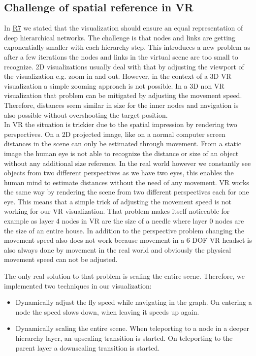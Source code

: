 \subsection{Challenge of spatial reference in VR}
\label{chap:ps-spatialReference}
In \hyperref[req:R7]{R7} we stated that the visualization should ensure an equal representation of deep hierarchical networks. The challenge is that nodes and links are getting exponentially smaller with each hierarchy step.
This introduces a new problem as after a few iterations the nodes and links in the virtual scene are too small to recognize.
2D visualizations usually deal with that by adjusting the viewport of the visualization e.g. zoom in and out. 
However, in the context of a 3D VR visualization a simple zooming approach is not possible. 
In a 3D non VR visualization that problem can be mitigated by adjusting the movement speed. Therefore, distances seem similar in size for the inner nodes and navigation is also possible without overshooting the target position.\\ 
In VR the situation is trickier due to the spatial impression by rendering two perspectives. On a 2D projected image, like on a normal computer screen distances in the scene can only be estimated through movement. From a static image the human eye is not able to recognize the distance or size of an object without any additional size reference. 
In the real world however we constantly see objects from two different perspectives as we have two eyes, this enables the human mind to estimate distances without the need of any movement. VR works the same way by rendering the scene from two different perspectives each for one eye.  
This means that a simple trick of adjusting the movement speed is not working for our VR visualization.
That problem makes itself noticeable for example as layer 4 nodes in VR are the size of a needle where layer 0 nodes are the size of an entire house.
In addition to the perspective problem changing the movement speed also does not work because movement in a 6-DOF VR headset is also always done by movement in the real world and obviously the physical movement speed can not be adjusted.

The only real solution to that problem is scaling the entire scene. Therefore, we implemented two techniques in our visualization:
\begin{itemize}
    \item Dynamically adjust the fly speed while navigating in the graph. On entering a node the speed slows down, when leaving it speeds up again. 
    \item Dynamically scaling the entire scene. When teleporting to a node in a deeper hierarchy layer, an upscaling transition is started. On teleporting to the parent layer a downscaling transition is started. 
\end{itemize} 

